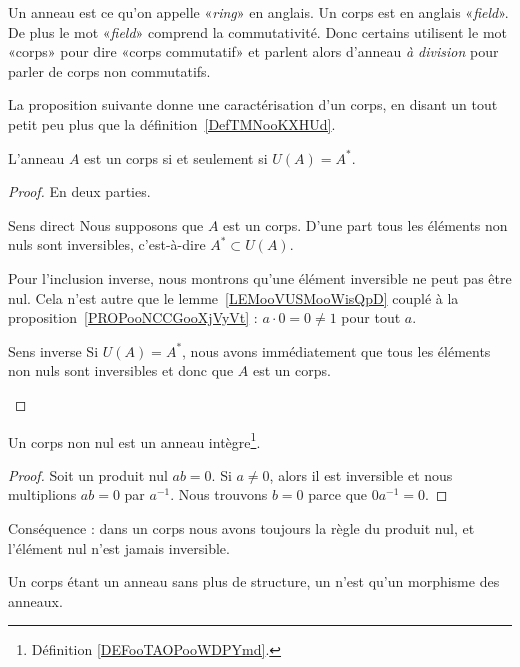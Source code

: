 \begin{remark}      \label{REMooYRNUooYgBBKF}
    Un anneau est ce qu'on appelle «\emph{ring}» en anglais. Un corps est en anglais «\emph{field}». De plus le mot «\emph{field}» comprend la commutativité. Donc certains utilisent le mot «corps» pour dire «corps commutatif» et parlent alors d'anneau \emph{à division} pour parler de corps non commutatifs.
\end{remark}

La proposition suivante donne une caractérisation d'un corps, en disant un tout petit peu plus que la définition~\ref{DefTMNooKXHUd}.
\begin{proposition}
    L'anneau $A$ est un corps si et seulement si \( U(A) = A^* \).
\end{proposition}

\begin{proof}
    En deux parties.
    \begin{subproof}
        \item[Sens direct]
            Nous supposons que \( A\) est un corps. D'une part tous les éléments non nuls sont inversibles, c'est-à-dire \( A^*\subset U(A)\).
            
            Pour l'inclusion inverse, nous montrons qu'une élément inversible ne peut pas être nul. Cela n'est autre que le lemme~\ref{LEMooVUSMooWisQpD} couplé à la proposition~\ref{PROPooNCCGooXjVyVt} : \( a\cdot 0=0\neq 1\) pour tout \( a\).
        \item[Sens inverse]
            Si \( U(A)=A^*\), nous avons immédiatement que tous les éléments non nuls sont inversibles et donc que \( A\) est un corps.
    \end{subproof}
\end{proof}

\begin{lemma}       \label{LemAnnCorpsnonInterdivzer}
    Un corps non nul est un anneau intègre\footnote{Définition \ref{DEFooTAOPooWDPYmd}.}.
\end{lemma}

\begin{proof}
    Soit un produit nul \( ab=0\). Si \( a\neq 0\), alors il est inversible et nous multiplions \( ab=0\) par \( a^{-1}\). Nous trouvons \( b=0\) parce que \( 0a^{-1}=0\).
\end{proof}
Conséquence : dans un corps nous avons toujours la règle du produit nul, et l'élément nul n'est jamais inversible.

\begin{definition}
    Un corps étant un anneau sans plus de structure, un  n'est qu'un morphisme des anneaux.
\end{definition}

